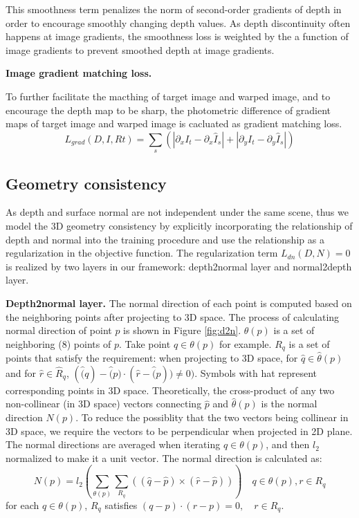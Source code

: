 This smoothness term penalizes the norm of second-order gradients of depth in order to encourage smoothly changing depth values. As depth discontinuity often happens at image gradients, the smoothness loss is weighted by the a function of image gradients to prevent smoothed depth at image gradients. 

\textbf{Image gradient matching loss.}

To further facilitate the macthing of target image and warped image, and to encourage the depth map to be sharp, the photometric difference of gradient maps of target image and warped image is cacluated as gradient matching loss.
$$L_{grad}(D, I, Rt) = \sum_s(|\partial_xI_t - \partial_x\hat{I}_s| + |\partial_yI_t - \partial_y\hat{I}_s|)$$


\subsection{Geometry consistency}

As depth and surface normal are not independent under the same scene, 
thus we model the 3D geometry consistency by explicitly incorporating the relationship of depth and normal into the training procedure and use the relationship as a regularization in the objective function. The regularization term $L_{dn}(D,N) = 0$ is realized by two layers in our framework: depth2normal layer and normal2depth layer.

\textbf{Depth2normal layer.} The normal direction of each point is computed based on the neighboring points after projecting to 3D space. The process of calculating normal direction of point $p$ is shown in Figure \ref{fig:d2n}. $\theta(p)$ is a set of neighboring (8) points of $p$. Take point $q \in \theta(p)$ for example. $R_{q}$ is a set of points that satisfy the requirement: when projecting to 3D space, for $\hat{q} \in \hat{\theta}(p)$ and for $\hat{r} \in \hat{R}_{q}$, $(\hat(q)-\hat(p) \cdot (\hat{r} - \hat(p)) \neq 0)$. Symbols with hat represent corresponding points in 3D space. Theoretically, the cross-product of any two non-collinear (in 3D space) vectors connecting $\hat{p}$ and $\hat{\theta}(p)$ is the normal direction $N(p)$. To reduce the possiblity that the two vectors being collinear in 3D space, we require the vectors to be perpendicular when projected in 2D plane. The normal directions are averaged when iterating $q \in \theta(p)$, and then $l_2$ normalized to make it a unit vector. The normal direction is calculated as:
$$N(p) = l_2(\sum_{\theta(p)}\sum_{R_q}((\hat{q} - \hat{p}) \times (\hat{r} - \hat{p}))) \quad q \in \theta(p), r \in R_q$$
for each $q\in\theta(p)$, $R_q$ satisfies $(q-p)\cdot(r-p) = 0, \quad r \in R_q$.

